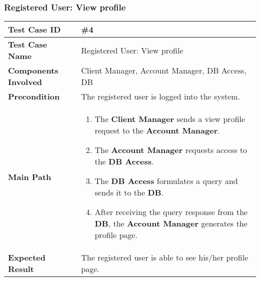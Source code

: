 \subsubsection{Registered User: View profile}
\begin{center}
	\begin{tabular} { | m{4.5cm} | m{8.5cm} | }
		\hline
		\textbf{Test Case ID} & \#4\\
		\hline
		\textbf{Test Case Name} & Registered User: View profile\\
		\hline
		\textbf{Components Involved} & Client Manager, Account Manager, DB Access, DB\\
		\hline
		\textbf{Precondition} & The registered user is logged into the system.\\
		\hline 
		\textbf{Main Path} & 
		\begin{enumerate}
			\item The \textbf{Client Manager} sends a view profile request to the \textbf{Account Manager}.
			\item The \textbf{Account Manager} requests access to the \textbf{DB Access}.
			\item The \textbf{DB Access} formulates a query and sends it to the \textbf{DB}.
			\item After receiving the query response from the \textbf{DB}, the \textbf{Account Manager} generates the profile page.
		\end{enumerate}\\
		\hline
		\textbf{Expected Result} & The registered user is able to see his/her profile page.\\
		\hline
	\end{tabular}
\end{center}
\newpage
